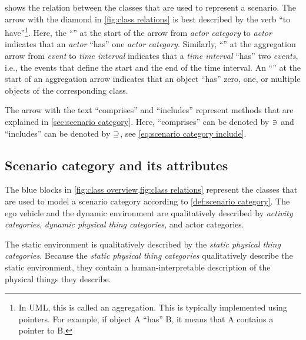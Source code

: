 \cstartb {} shows the relation between the classes that are used to represent a scenario. \cendb
The arrow with the diamond in \cref{fig:class relations} is best described by the verb ``to have''\footnote{In UML, this is called an aggregation. This is typically implemented using pointers. For example, if object A ``has'' B, it means that A contains a pointer to B.}. 
\cstartb Here, the ``\hasone'' at the start of the arrow from \textit{actor category} to \textit{actor} indicates that an \textit{actor} ``has'' one \textit{actor category}. Similarly, ``\hastwo'' at the aggregation arrow from \textit{event} to \textit{time interval} indicates that a \textit{time interval} ``has'' two \textit{events}, i.e., the events that define the start and the end of the time interval. \cendb 
An ``\hasn'' at the start of an aggregation arrow indicates that an object ``has'' zero, one, or multiple objects of the corresponding class.

\begin{figure*}[t]
	\centering
	
	\caption{Schematic overview of the relation between the classes for representing the scenarios for the assessment of automated vehicles.}
	\label{fig:class relations}
\end{figure*}

The arrow with the text ``comprises'' and ``includes'' represent methods that are explained in \cref{sec:scenario category}. Here, ``comprises'' can be denoted by $\ni$ and ``includes'' can be denoted by $\supseteq$, see \cref{eq:scenario category include}. 



\subsection{Scenario category and its attributes}
\label{sec:domain scenario category}

The blue blocks in \cref{fig:class overview,fig:class relations} represent the classes that are used to model a scenario category according to \cref{def:scenario category}.
The ego vehicle and the dynamic environment are qualitatively described by \textit{activity categories}, \cstartb\textit{dynamic physical thing categories}\cendb, and actor categories. 

The static environment is qualitatively described by \cstartc the \textit{static physical thing categories}. \cendc
Because the \cstartc\textit{static physical thing categories} \cendc qualitatively describe the static environment, they contain a human-interpretable description of the \cstartc physical things they describe\cendc.

